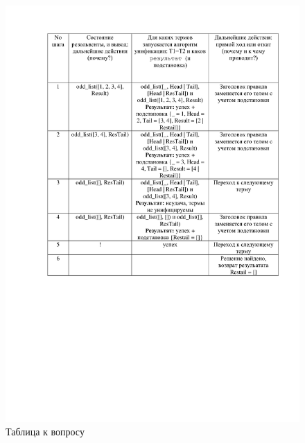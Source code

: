 \documentclass[12pt]{report}
\begin{document}
\begin{figure}[H]
	\centering
	\includegraphics[scale=0.25]{lab_08_01.jpg}
	\caption{Таблица к вопросу}
	\label{d:matr_rec}
\end{figure}


	
\end{document}
